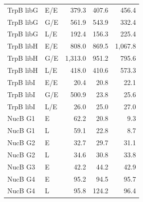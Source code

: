 \begin{longtable}[c]{llrrr}
TrpB libG & E/E & 379.3 & 407.6 & 456.4 \\
TrpB libG & G/E & 561.9 & 543.9 & 332.4 \\
TrpB libG & L/E & 192.4 & 156.3 & 225.4 \\
TrpB libH & E/E & 808.0 & 869.5 & 1,067.8 \\
TrpB libH & G/E & 1,313.0 & 951.2 & 795.6 \\
TrpB libH & L/E & 418.0 & 410.6 & 573.3 \\
TrpB libI & E/E & 20.4 & 20.8 & 22.1 \\
TrpB libI & G/E & 500.9 & 23.8 & 25.6 \\
TrpB libI & L/E & 26.0 & 25.0 & 27.0 \\
NucB G1 & E & 62.2 & 20.8 & 9.3 \\
NucB G1 & L & 59.1 & 22.8 & 8.7 \\
NucB G2 & E & 32.7 & 29.7 & 31.1 \\
NucB G2 & L & 34.6 & 30.8 & 33.8 \\
NucB G3 & E & 42.2 & 44.2 & 42.9 \\
NucB G4 & E & 95.2 & 94.5 & 95.7 \\
NucB G4 & L & 95.8 & 124.2 & 96.4 \\
\end{longtable}
\endgroup
